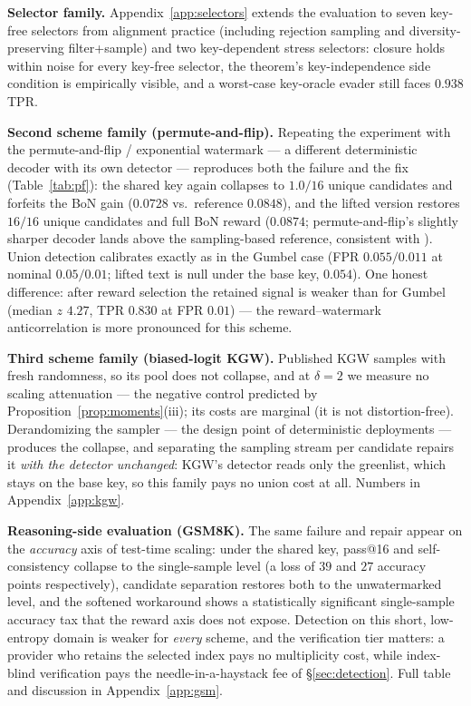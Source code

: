 \documentclass{article} %
\begin{document}
\textbf{Selector family.}
Appendix~\ref{app:selectors} extends the evaluation to seven key-free
selectors from alignment practice (including rejection sampling and
diversity-preserving filter+sample) and two
key-dependent stress selectors: closure holds within noise for every key-free
selector, the theorem's key-independence side condition is empirically visible,
and a worst-case key-oracle evader still faces $0.938$ TPR.

\textbf{Second scheme family (permute-and-flip).}
Repeating the experiment with the permute-and-flip / exponential watermark
\citep{zhao2024permute} --- a different deterministic decoder with its own
detector --- reproduces both the failure and the fix
(Table~\ref{tab:pf}): the shared key again collapses to $1.0/16$ unique
candidates and forfeits the BoN gain ($0.0728$ vs.\ reference $0.0848$), and the
lifted version restores $16/16$ unique candidates and full BoN reward
($0.0874$; permute-and-flip's slightly sharper decoder lands above the
sampling-based reference, consistent with \citealp{zhao2024permute}). Union detection
calibrates exactly as in the Gumbel case (FPR $0.055/0.011$ at nominal
$0.05/0.01$; lifted text is null under the base key, $0.054$). One honest
difference: after reward selection the retained signal is weaker than for
Gumbel (median $z$ $4.27$, TPR $0.830$ at FPR $0.01$) --- the
reward--watermark anticorrelation is more pronounced for this scheme.

\textbf{Third scheme family (biased-logit KGW).}
Published KGW samples with fresh randomness, so its pool does not collapse,
and at $\delta{=}2$ we measure no scaling attenuation --- the negative
control predicted by Proposition~\ref{prop:moments}(iii); its costs are
marginal (it is not distortion-free). Derandomizing the sampler --- the
design point of deterministic deployments --- produces the collapse, and
separating the sampling stream per candidate repairs it \emph{with the
detector unchanged}: KGW's detector reads only the greenlist, which stays on
the base key, so this family pays no union cost at all. Numbers in
Appendix~\ref{app:kgw}.

\textbf{Reasoning-side evaluation (GSM8K).}
The same failure and repair appear on the \emph{accuracy} axis of test-time
scaling: under the shared key, pass@16 and self-consistency collapse to the
single-sample level (a loss of $39$ and $27$ accuracy points respectively),
candidate separation restores both to the unwatermarked level, and the
softened workaround shows a statistically significant single-sample accuracy
tax that the reward axis does not expose. Detection on this short,
low-entropy domain is weaker for \emph{every} scheme, and the verification
tier matters: a provider who retains the selected index pays no multiplicity
cost, while index-blind verification pays the needle-in-a-haystack fee of
\S\ref{sec:detection}. Full table and discussion in
Appendix~\ref{app:gsm}.
\end{document}
